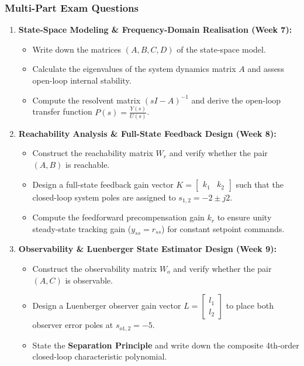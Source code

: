 \documentclass[12pt,onecolumn,twoside ]{article}
\begin{document}
	\subsubsection{Multi-Part Exam Questions}
	\begin{enumerate}
		\item
		\textbf{State-Space Modeling \& Frequency-Domain Realisation (Week 7):}
		\begin{itemize}
			\item
			Write down the matrices $(A, B, C, D)$ of the state-space model.
			\item
			Calculate the eigenvalues of the system dynamics matrix $A$ and assess open-loop internal stability.
			\item
			Compute the resolvent matrix $(sI - A)^{-1}$ and derive the open-loop transfer function $P(s) = \frac{Y(s)}{U(s)}$.
		\end{itemize}
		\item
		\textbf{Reachability Analysis \& Full-State Feedback Design (Week 8):}
		\begin{itemize}
			\item
			Construct the reachability matrix $W_r$ and verify whether the pair $(A, B)$ is reachable.
			\item
			Design a full-state feedback gain vector $K = \begin{bmatrix} k_1 & k_2 \end{bmatrix}$ such that the closed-loop system poles are assigned to $s_{1,2} = -2 \pm j2$.
			\item
			Compute the feedforward precompensation gain $k_r$ to ensure unity steady-state tracking gain ($y_{ss} = r_{ss}$) for constant setpoint commands.
		\end{itemize}
		\item
		\textbf{Observability \& Luenberger State Estimator Design (Week 9):}
		\begin{itemize}
			\item
			Construct the observability matrix $W_o$ and verify whether the pair $(A, C)$ is observable.
			\item
			Design a Luenberger observer gain vector $L = \begin{bmatrix} l_1 \\ l_2 \end{bmatrix}$ to place both observer error poles at $s_{o1,2} = -5$.
			\item
			State the \textbf{Separation Principle} and write down the composite 4th-order closed-loop characteristic polynomial.

\end{itemize}
\end{enumerate}
\end{document}
